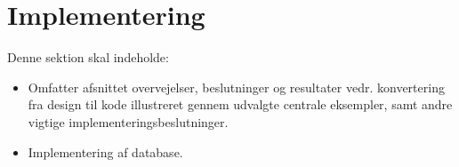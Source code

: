 \section{Implementering}
Denne sektion skal indeholde:

\begin{itemize}
    \item Omfatter afsnittet overvejelser, beslutninger og resultater vedr.  konvertering fra design til kode illustreret gennem udvalgte centrale eksempler, samt andre vigtige implementeringsbeslutninger. 
    \item Implementering af database.
\end{itemize}{}